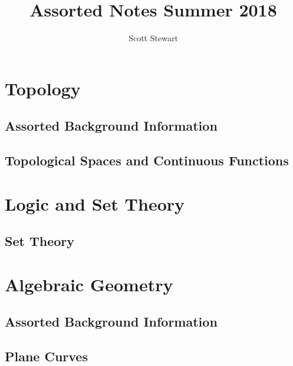 \documentclass[10pt]{report}
\begin{document}
\title{Assorted Notes Summer 2018}
\author{Scott Stewart}
\maketitle
\tableofcontents

\part{Topology}
\chapter{Assorted Background Information}

\chapter{Topological Spaces and Continuous Functions}

 
\part{Logic and Set Theory}
\chapter{Set Theory}


\part{Algebraic Geometry}
\chapter{Assorted Background Information}

\chapter{Plane Curves}

\end{document}
